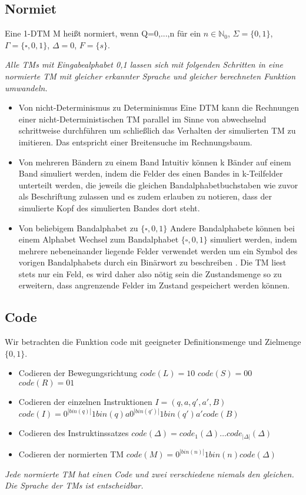 \documentclass[DIV=15]{scrartcl}
\begin{document}
\subsection{Normiet}
    Eine 1-DTM M heißt normiert, wenn Q={0,...,n} für ein \(n\in\mathbb{N}_0\), \(\Sigma=\{0,1\}\), \(\Gamma=\{\square,0,1\}\), \(\Delta=0\), \(F=\{s\}\).\par\bigskip
    \textit{
        Alle TMs mit Eingabealphabet {0,1} lassen sich mit folgenden Schritten in eine normierte TM mit gleicher erkannter Sprache und gleicher berechneten Funktion umwandeln.}
    \begin{itemize}
        \item Von nicht-Determinismus zu Determinismus
            \subitem Eine DTM kann die Rechnungen einer nicht-Deterministischen TM parallel im Sinne von abwechselnd schrittweise durchführen 
            um schließlich das Verhalten der simulierten TM zu imitieren.
            Das entspricht einer Breitensuche im Rechnungsbaum.
        \item Von mehreren Bändern zu einem Band
            \subitem Intuitiv können k Bänder auf einem Band simuliert werden, indem die Felder des einen Bandes in k-Teilfelder unterteilt werden, 
            die jeweils die gleichen Bandalphabetbuchstaben wie zuvor als Beschriftung zulassen und es zudem erlauben zu notieren, dass der simulierte Kopf des simulierten Bandes dort steht.  
        \item Von beliebigem Bandalphabet zu \(\{\square,0,1\}\)
        \subitem Andere Bandalphabete können bei einem Alphabet Wechsel zum Bandalphabet \(\{\square,0,1\}\) simuliert werden, 
        indem mehrere nebeneinander liegende Felder verwendet werden um ein Symbol des vorigen Bandalphabets durch ein Binärwort zu beschreiben .
        Die TM liest stets nur ein Feld, es wird daher also nötig sein die Zustandsmenge so zu erweitern, dass angrenzende Felder im Zustand gespeichert werden können.
    \end{itemize}
\subsection{Code}
    Wir betrachten die Funktion code mit geeigneter Definitionsmenge und Zielmenge \(\{0,1\}\).
    \begin{itemize}
        \item Codieren der Bewegungsrichtung
            \subitem \(code(L)=10\)
            \subitem \(code(S)=00\)
            \subitem \(code(R)=01\)
        \item Codieren der einzelnen Instruktionen
            \subitem \(I=(q,a,q',a',B)\)
            \subitem \(code(I)=0^{|bin(q)|}1bin(q)a0^{|bin(q')|}1bin(q')a'code(B)\)
        \item Codieren des Instruktinssatzes 
            \subitem \(code(\Delta)=code_1(\Delta)\dots code_{|\Delta|}(\Delta)\)
        \item Codieren der normierten TM 
            \subitem \(code(M)=0^{|bin(n)|}1bin(n)code(\Delta)\)    
    \end{itemize}
    \textit{Jede normierte TM hat einen Code und zwei verschiedene niemals den gleichen. Die Sprache der TMs ist entscheidbar.}   
\end{document}
